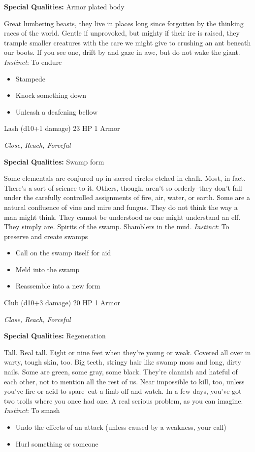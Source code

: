 \textbf{Special Qualities:}
Armor plated body

\HRule
Great lumbering beasts, they live in places long since forgotten by the thinking races of the world. Gentle if unprovoked, but mighty if their ire is raised, they trample smaller creatures with the care we might give to crushing an ant beneath our boots. If you see one, drift by and gaze in awe, but do not wake the giant. \emph{Instinct}: To endure
\begin{itemize}
\item Stampede
\item Knock something down
\item Unleash a deafening bellow
\end{itemize}

\HRule
{}

Lash (d10+1 damage)\hspace*{\fill} 23 HP 1 Armor

\emph{Close, Reach, Forceful}

\textbf{Special Qualities:}
Swamp form

\HRule
Some elementals are conjured up in sacred circles etched in chalk. Most, in fact. There's a sort of science to it. Others, though, aren't so orderly--they don't fall under the carefully controlled assignments of fire, air, water, or earth. Some are a natural confluence of vine and mire and fungus. They do not think the way a man might think. They cannot be understood as one might understand an elf. They simply are. Spirits of the swamp. Shamblers in the mud. \emph{Instinct}: To preserve and create swamps
\begin{itemize}
\item Call on the swamp itself for aid
\item Meld into the swamp
\item Reassemble into a new form
\end{itemize}
\newpage
\HRule
{}

Club (d10+3 damage)\hspace*{\fill} 20 HP 1 Armor

\emph{Close, Reach, Forceful}

\textbf{Special Qualities:}
Regeneration

\HRule
Tall. Real tall. Eight or nine feet when they're young or weak. Covered all over in warty, tough skin, too. Big teeth, stringy hair like swamp moss and long, dirty nails. Some are green, some gray, some black. They're clannish and hateful of each other, not to mention all the rest of us. Near impossible to kill, too, unless you've fire or acid to spare--cut a limb off and watch. In a few days, you've got two trolls where you once had one. A real serious problem, as you can imagine. \emph{Instinct}: To smash
\begin{itemize}
\item Undo the effects of an attack (unless caused by a weakness, your call)
\item Hurl something or someone
\end{itemize}

